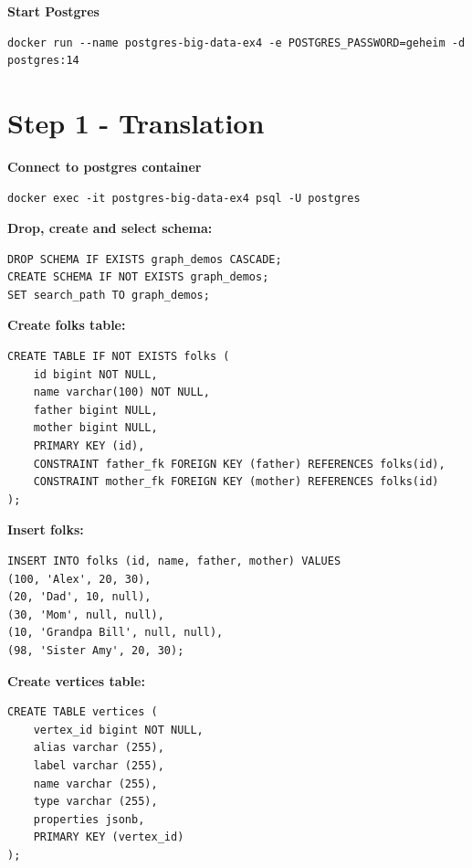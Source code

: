 \documentclass[14pt,a4paper]{extarticle}
\begin{document}
	\noindent \textbf{Start Postgres}
	\begin{lstlisting}[style=fish]
docker run --name postgres-big-data-ex4 -e POSTGRES_PASSWORD=geheim -d postgres:14
	\end{lstlisting}

	\section*{Step 1 - Translation}
	\noindent \textbf{Connect to postgres container}
	\begin{lstlisting}[style=sql]
docker exec -it postgres-big-data-ex4 psql -U postgres
	\end{lstlisting}

	\noindent \textbf{Drop, create and select schema:}
	\begin{lstlisting}[style=sql]
DROP SCHEMA IF EXISTS graph_demos CASCADE;
CREATE SCHEMA IF NOT EXISTS graph_demos;
SET search_path TO graph_demos;
	\end{lstlisting}

	\noindent \textbf{Create folks table:}
	\begin{lstlisting}[style=sql]
CREATE TABLE IF NOT EXISTS folks (
	id bigint NOT NULL,
	name varchar(100) NOT NULL,
	father bigint NULL,
	mother bigint NULL,
	PRIMARY KEY (id),
	CONSTRAINT father_fk FOREIGN KEY (father) REFERENCES folks(id),
	CONSTRAINT mother_fk FOREIGN KEY (mother) REFERENCES folks(id)
);
	\end{lstlisting}

	\newpage
	
	\noindent \textbf{Insert folks:}
	\begin{lstlisting}[style=sql]
INSERT INTO folks (id, name, father, mother) VALUES
(100, 'Alex', 20, 30),
(20, 'Dad', 10, null),
(30, 'Mom', null, null),
(10, 'Grandpa Bill', null, null),
(98, 'Sister Amy', 20, 30);
	\end{lstlisting}

	\noindent \textbf{Create vertices table:}
	\begin{lstlisting}[style=sql]
CREATE TABLE vertices (
	vertex_id bigint NOT NULL,
	alias varchar (255),
	label varchar (255),
	name varchar (255),
	type varchar (255),
	properties jsonb,
	PRIMARY KEY (vertex_id)
);
	\end{lstlisting}
\end{document}
